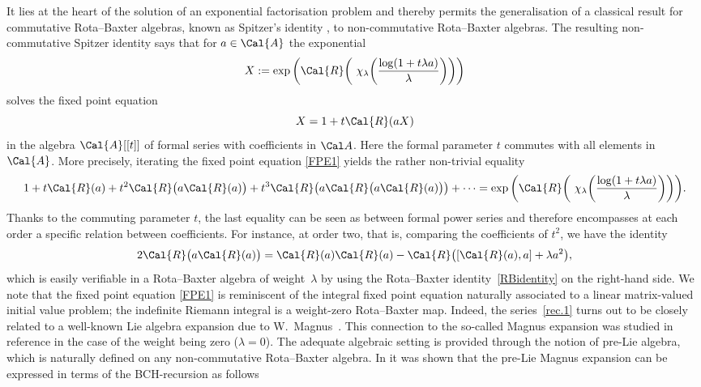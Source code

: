 \documentclass[10pt,a4paper]{amsart}
\numberwithin{equation}{section}
\begin{document}
It lies at the heart of the solution of an exponential factorisation problem \cite{KLM06} and thereby permits the generalisation of a classical result for commutative Rota--Baxter algebras, known as Spitzer's identity \cite{Sp56}, to non-commutative Rota--Baxter algebras. The resulting non-com\-mu\-ta\-tive Spitzer identity says that for $a \in \Cal{A}$ the exponential
\begin{displaymath}
X:=\exp\bigg( \Cal{R}\bigg(\ \chi_{\lambda}\bigg( \frac{\log(1+t\lambda a)}{\lambda}\bigg)\bigg) \bigg)
\end{displaymath}
solves the fixed point equation
\begin{equation}
\label{FPE1}
X = 1 + t\Cal{R}(aX)
\end{equation}
 in the algebra $\Cal{A}[[t]]$ of formal series with coefficients in $\Cal A$. Here the formal parameter $t$ commutes with all elements in $\Cal{A}$.
More precisely, iterating the fixed point equation \eqref{FPE1} yields the rather non-trivial equality
\begin{displaymath}
1+ t\Cal{R}(a) + t^2\Cal{R}\big(a\Cal{R}(a)\big) + t^3\Cal{R}\big(a\Cal{R}\big(a\Cal{R}(a)\big)\big) + \cdots
= \exp\bigg( \Cal{R}\bigg(\ \chi_{\lambda}\bigg( \frac{\log(1+ t\lambda a)}{\lambda}\bigg)\bigg) \bigg).
\end{displaymath}
Thanks to the commuting parameter $t$, the last equality can be seen as between formal power series and therefore encompasses at each order a specific relation between coefficients. For instance, at order two, that is, comparing the coefficients of $t^2$, we have the identity
\begin{displaymath}
2 \Cal{R}\big(a\Cal{R}(a)\big) = \Cal{R}(a)\Cal{R}(a) - \Cal{R}\big([\Cal{R}(a),a] + \lambda a^2\big),
\end{displaymath}
which is easily verifiable in a Rota--Baxter algebra of weight~$\lambda$ by using the Rota--Baxter identity~\eqref{RBidentity} on the right-hand side. We note that the fixed point equation \eqref{FPE1} is reminiscent of the integral fixed point equation naturally associated to a linear matrix-valued initial value problem; the indefinite Riemann integral is a weight-zero Rota--Baxter map. Indeed, the series~\eqref{rec.1} turns out to be closely related to a well-known Lie algebra expansion due to W.~Mag\-nus~\cite{WM54}. This connection to the so-called Magnus expansion was studied in reference \cite{KLM06} in the case of the weight being zero ($\lambda=0$). The adequate algebraic setting is provided through the notion of pre-Lie algebra, which is naturally defined on any non-commutative Rota--Baxter algebra. In \cite{KM08} it was shown that the pre-Lie Magnus expansion can be expressed in terms of the BCH-recursion as follows
\end{document}
